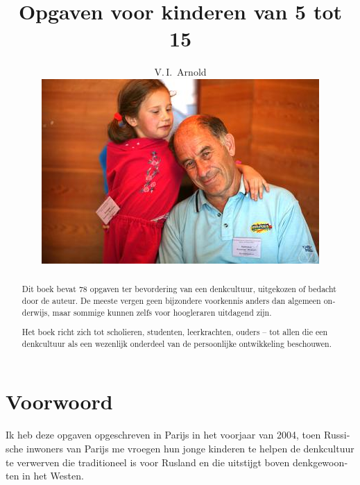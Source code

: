 
\setdefaultlanguage{dutch}
\DeclareSIUnit[number-unit-product=\,]
\renewcommand{\leq}{\leqslant}
\renewcommand{\geq}{\geqslant}

\title{Opgaven voor kinderen van 5 tot 15}
\author{V.\,I.~Arnold
\vspace*{2cm}\\
\includegraphics[width=\linewidth]{resources/photo-arnold_small}
}
\date{}



\maketitle
\thispagestyle{empty}
\cleardoublepage
\setcounter{page}{1}

\begin{abstract}
Dit boek bevat 78 opgaven ter bevordering van een denkcultuur, uitgekozen of bedacht door de auteur. De meeste vergen geen bijzondere voorkennis anders dan algemeen onderwijs, maar som\-mige kunnen zelfs voor hoogleraren uitdagend zijn.

Het boek richt zich tot scholieren, studenten, leerkrachten, ouders -- tot allen die een denkcultuur als een wezenlijk onderdeel van de persoonlijke ontwikkeling beschouwen.
\end{abstract}

\cleardoublepage

\section*{Voorwoord}
Ik heb deze opgaven opgeschreven in Parijs in het voorjaar van 2004, toen Russische inwoners van Parijs me vroegen hun jonge kinderen te helpen de denkcultuur te verwerven die traditioneel is voor Rusland en die uitstijgt boven denkgewoonten in het Westen.

